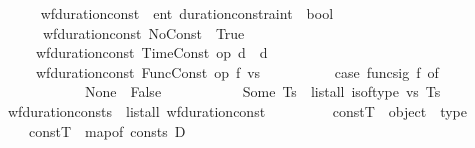 \begin{isabellebody}
\isanewline
\ \ \ \ \isamarkupfalse%
\ wf{\isacharunderscore}{\kern0pt}duration{\isacharunderscore}{\kern0pt}const\ {\isacharcolon}{\kern0pt}{\isacharcolon}{\kern0pt}\ {\isachardoublequoteopen}{\isacharprime}{\kern0pt}ent\ duration{\isacharunderscore}{\kern0pt}constraint\ {\isasymRightarrow}\ bool{\isachardoublequoteclose}\ \isanewline
\ \ \ \ \ \ {\isachardoublequoteopen}wf{\isacharunderscore}{\kern0pt}duration{\isacharunderscore}{\kern0pt}const\ No{\isacharunderscore}{\kern0pt}Const\ {\isasymlongleftrightarrow}\ True{\isachardoublequoteclose}\isanewline
\ \ \ \ {\isacharbar}{\kern0pt}\ {\isachardoublequoteopen}wf{\isacharunderscore}{\kern0pt}duration{\isacharunderscore}{\kern0pt}const\ {\isacharparenleft}{\kern0pt}Time{\isacharunderscore}{\kern0pt}Const\ op\ d{\isacharparenright}{\kern0pt}\ {\isasymlongleftrightarrow}\ d\ {\isasymge}\ {}{\isachardoublequoteclose}\isanewline
\ \ \ \ {\isacharbar}{\kern0pt}\ {\isachardoublequoteopen}wf{\isacharunderscore}{\kern0pt}duration{\isacharunderscore}{\kern0pt}const\ {\isacharparenleft}{\kern0pt}Func{\isacharunderscore}{\kern0pt}Const\ op\ f\ vs{\isacharparenright}{\kern0pt}\ {\isasymlongleftrightarrow}\ \isanewline
\ \ \ \ \ \ \ \ {\isacharparenleft}{\kern0pt}case\ func{\isacharunderscore}{\kern0pt}sig\ f\ of\isanewline
\ \ \ \ \ \ \ \ \ \ \ \ None\ {\isasymRightarrow}\ False\isanewline
\ \ \ \ \ \ \ \ \ \ {\isacharbar}{\kern0pt}\ Some\ Ts\ {\isasymRightarrow}\ list{\isacharunderscore}{\kern0pt}all{}\ is{\isacharunderscore}{\kern0pt}of{\isacharunderscore}{\kern0pt}type\ vs\ Ts{\isacharparenright}{\kern0pt}{\isachardoublequoteclose}\isanewline
\isanewline
\ \ \ \ \isamarkupfalse%
\ {\isachardoublequoteopen}wf{\isacharunderscore}{\kern0pt}duration{\isacharunderscore}{\kern0pt}consts\ {\isacharequal}{\kern0pt}\ list{\isacharunderscore}{\kern0pt}all\ wf{\isacharunderscore}{\kern0pt}duration{\isacharunderscore}{\kern0pt}const{\isachardoublequoteclose}\ \isanewline
\ \ \isamarkupfalse%
\ %
\isanewline
\isanewline
\isanewline
\ \ \isamarkupfalse%
\ constT\ {\isacharcolon}{\kern0pt}{\isacharcolon}{\kern0pt}\ {\isachardoublequoteopen}object\ {\isasymrightharpoonup}\ type{\isachardoublequoteclose}\ \isanewline
\ \ \ \ {\isachardoublequoteopen}constT\ {\isasymequiv}\ map{\isacharunderscore}{\kern0pt}of\ {\isacharparenleft}{\kern0pt}consts\ D{\isacharparenright}{\kern0pt}{\isachardoublequoteclose}%

\end{isabellebody}

